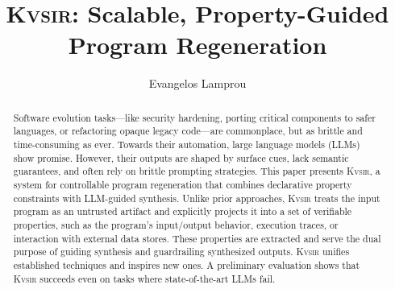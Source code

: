\documentclass[sigplan,review,anonymous,10pt]{acmart}
\newcommand{\sys}{{\scshape Kv{\textalpha}sir}\xspace}
\begin{document}
\title{\sys: Scalable, Property-Guided\\ Program Regeneration}
\author{Evangelos Lamprou}



\begin{abstract}
  Software evolution tasks---like security hardening, porting critical components to safer 
  languages, or refactoring opaque legacy code---are commonplace, but as brittle and time-consuming as ever.
  Towards their automation, large language models (LLMs) show promise.
  However, their outputs are shaped by surface cues, lack semantic guarantees, and often rely on brittle prompting strategies.
  This paper presents \sys, a system for controllable program regeneration that
  combines declarative property constraints with LLM-guided synthesis.
  Unlike
  prior approaches, \sys treats the input program as an untrusted artifact and
  explicitly projects it into a set of verifiable properties, such as
  the program's input/output behavior, execution traces, or interaction with external data stores.
  These properties are extracted and serve the dual purpose of guiding synthesis and guardrailing synthesized outputs.
  \sys unifies established techniques and inspires new ones. %
  A preliminary evaluation shows that \sys succeeds even on tasks where state-of-the-art LLMs fail.
\end{abstract}

\end{document}
